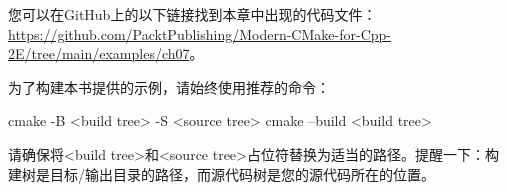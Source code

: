 

您可以在GitHub上的以下链接找到本章中出现的代码文件：\url{https://github.com/PacktPublishing/Modern-CMake-for-Cpp-2E/tree/main/examples/ch07}。

为了构建本书提供的示例，请始终使用推荐的命令：

\begin{shell}
cmake -B <build tree> -S <source tree>
cmake --build <build tree>
\end{shell}

请确保将<build tree>和<source tree>占位符替换为适当的路径。提醒一下：构建树是目标/输出目录的路径，而源代码树是您的源代码所在的位置。














